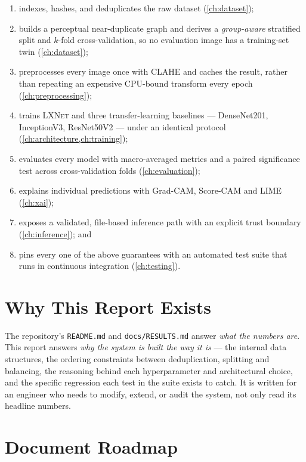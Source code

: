 \documentclass[11pt,a4paper,oneside]{report}
\newcommand{\LXNet}{\textsc{LXNet}}
\begin{document}
\begin{enumerate}
\item indexes, hashes, and deduplicates the raw dataset (\cref{ch:dataset});
\item builds a perceptual near-duplicate graph and derives a
  \emph{group-aware} stratified split and $k$-fold cross-validation, so no
  evaluation image has a training-set twin (\cref{ch:dataset});
\item preprocesses every image once with CLAHE and caches the result, rather
  than repeating an expensive CPU-bound transform every epoch
  (\cref{ch:preprocessing});
\item trains \LXNet{} and three transfer-learning baselines --- DenseNet201,
  InceptionV3, ResNet50V2 --- under an identical protocol
  (\cref{ch:architecture,ch:training});
\item evaluates every model with macro-averaged metrics and a paired
  significance test across cross-validation folds (\cref{ch:evaluation});
\item explains individual predictions with Grad-CAM, Score-CAM and LIME
  (\cref{ch:xai});
\item exposes a validated, file-based inference path with an explicit trust
  boundary (\cref{ch:inference}); and
\item pins every one of the above guarantees with an automated test suite
  that runs in continuous integration (\cref{ch:testing}).
\end{enumerate}

\section{Why This Report Exists}

The repository's \texttt{README.md} and \texttt{docs/RESULTS.md} answer
\emph{what the numbers are}. This report answers \emph{why the system is
built the way it is} --- the internal data structures, the ordering
constraints between deduplication, splitting and balancing, the reasoning
behind each hyperparameter and architectural choice, and the specific
regression each test in the suite exists to catch. It is written for an
engineer who needs to modify, extend, or audit the system, not only read its
headline numbers.

\section{Document Roadmap}
\end{document}
